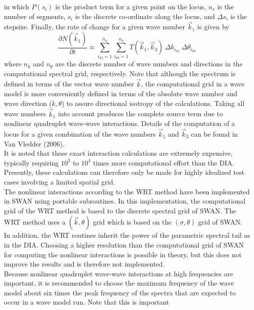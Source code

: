 \documentclass[12pt]{book}
\begin{document}
in which $P(s_i)$ is the product term for a given point on the locus,
$n_s$ is the number of segments, $s_i$ is the discrete co-ordinate
along the locus, and $\Delta s_i$ is the stepsize. Finally, the rate
of change for a given wave number $\vec{k}_1 $ is given by
\begin{equation}
\frac{\partial N(\vec{k}_1)}{\partial t} \approx \sum_{i_{k3}  = 1}^{n_k }
{\sum_{i_{\theta 3}  = 1}^{n_\theta  } T(\vec{k}_1,\vec{k}_3) \: \Delta
k_{i_{k3}} \: \Delta \theta_{i_{\theta 3} } } \label{eq:WRT_numT}
\end{equation}
where $n_k$ and $n_\theta$ are the discrete number of wave numbers and
directions in the computational spectral grid, respectively. Note that although
the spectrum is defined in terms of the vector wave number $\vec{k}$, the
computational grid in a wave model is more conveniently defined in
terms of the absolute wave number and wave direction ($k,\theta$) to
assure directional isotropy of the calculations. Taking all wave
numbers $\vec{k}_1 $ into account produces the complete source term due to
nonlinear quadruplet wave-wave interactions. Details of the
computation of a locus for a given combination of the wave numbers
$\vec{k}_1 $  and $\vec{k}_3 $ can be found in Van Vledder (2006).
\\[2ex]
\noindent
It is noted that these exact interaction calculations are
extremely expensive, typically requiring $10^3$ to $10^4$ times more
computational effort than the DIA. Presently, these calculations can
therefore only be made for highly idealized test cases involving a
limited spatial grid.
\\[2ex]
\noindent
The nonlinear interactions according to the WRT method have been
implemented in SWAN using portable subroutines.
In this implementation, the computational grid of the
WRT method is based to the discrete spectral grid of SWAN.
The WRT method uses a $(\vec{k},\theta)$ grid which is based on the
$(\sigma,\theta)$ grid of SWAN.
In addition, the WRT routines inherit the power of the parametric
spectral tail as in the DIA. Choosing a higher resolution than the computational
grid of SWAN for computing the nonlinear interactions is possible in theory, but this
does not improve the results and is therefore not implemented.
\\[2ex]
\noindent
Because nonlinear quadruplet wave-wave interactions at high
frequencies are important, it is recommended to choose the maximum
frequency of the wave model about six times the peak frequency of the
spectra that are expected to occur in a wave model run. Note that this is important
\end{document}

